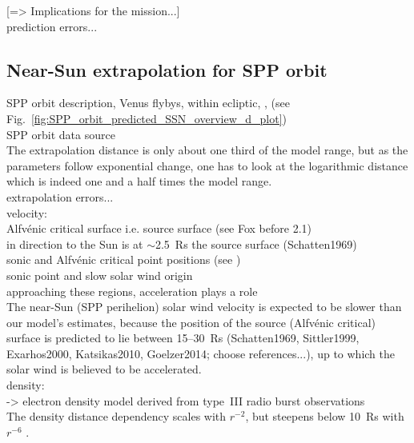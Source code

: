 [=> Implications for the mission...]\\

prediction errors...\\

\subsection{Near-Sun extrapolation for SPP orbit}

SPP orbit description, Venus flybys, within ecliptic, \citep{Fox2015}, (see Fig.~\ref{fig:SPP_orbit_predicted_SSN_overview_d_plot})\\

SPP orbit data source\\

The extrapolation distance is only about one third of the model range, but as the parameters follow exponential change, one has to look at the logarithmic distance which is indeed one and a half times the model range.\\

extrapolation errors...\\

velocity:\\
Alfvénic critical surface i.e. source surface (see Fox before 2.1)\\
in direction to the Sun is at $\sim$2.5~Rs the source surface (Schatten1969)\\
sonic and Alfvénic critical point positions (see \citet{Sittler1999})\\
sonic point and slow solar wind origin \citep{Sheeley1997}\\
approaching these regions, acceleration plays a role\\

The near-Sun (SPP perihelion) solar wind velocity is expected to be slower than our model's estimates, because the position of the source (Alfvénic critical) surface is predicted to lie between 15--30~Rs (Schatten1969, Sittler1999, Exarhos2000, Katsikas2010, Goelzer2014; choose references...), up to which the solar wind is believed to be accelerated.\\

density:\\
\citet{Leblanc1998} -> electron density model derived from type~III radio burst observations\\
The density distance dependency scales with $r^{-2}$, but steepens below 10~Rs with $r^{-6}$ \citep{Leblanc1998}.\\

